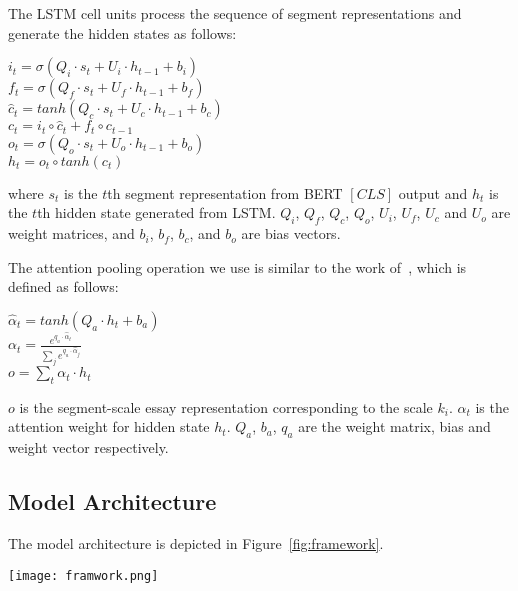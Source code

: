 \documentclass[11pt]{article}
\begin{document}
The LSTM cell units process the sequence of segment representations and generate the hidden states as follows:

\begin{center}
\label{eq:lstm_it}
$i_t =\sigma(Q_i \cdot s_t + U_i \cdot {h}_{t-1} + b_i)$ \\
\label{eq:lstm_ft}
$f_t =\sigma(Q_f \cdot s_t + U_f \cdot {h}_{t-1} + b_f)$  \\
\label{eq:lstm_ct_hat}
$\hat c_t =tanh(Q_c \cdot s_t + U_c \cdot {h}_{t-1} + b_c)$  \\
\label{eq:lstm_ct}
$c_t =i_t \circ \hat c_t + f_t \circ {c}_{t-1}$  \\
\label{eq:lstm_ot}
$o_t =\sigma(Q_o \cdot s_t + U_o\cdot {h}_{t-1} + b_o)$ \\
\label{eq:lstm_ht}
$h_t = o_t \circ tanh(c_t)$  \\
\end{center}



 where $s_t$ is the $t${th} segment representation from BERT $[CLS]$ output and $h_t$ is the $t$th hidden state generated from LSTM. $Q_i$, $Q_f$, $Q_c$, $Q_o$, $U_i$, $U_f$, $U_c$ and $U_o$ are weight matrices, and $b_i$, $b_f$, $b_c$, and $b_o$ are bias vectors. 
 
 The attention pooling operation we use is similar to the work of~\citep{Dong:2017}, which is defined as follows:

\begin{center}
\label{eq:atten_alpha_hat}
$\hat \alpha_t=tanh(Q_a \cdot h_t+b_a)$ \\
\label{eq:atten_alpha}
$\alpha_t=\frac{e^{q_a \cdot \hat \alpha_t}}{\sum_{j} e^{q_a \cdot \hat \alpha_j}}$ \\
\label{eq:atten_o}
$o=\sum_{t}{\alpha_t \cdot h_t}$ \\
\end{center}

 $o$ is the segment-scale essay representation corresponding to the scale $k_i$.
 $\alpha_t$ is the attention weight for hidden state $h_t$.
 $Q_a$, $b_a$, $q_a$ are the weight matrix, bias and weight vector respectively.


\subsection{Model Architecture}
The model architecture is depicted in Figure~\ref{fig:framework}.


\begin{figure*}[ht]
\centering
\texttt{[image: framwork.png]}
\caption{
The proposed automated essay scoring architecture based on multi-scale essay representation.
The left part illustrates the document-scale and token-scale essay representation and scoring module,
and the right part illustrates $S$ segment-scale essay representations and scoring modules.}
\label{fig:framework}
\end{figure*}
\end{document}
